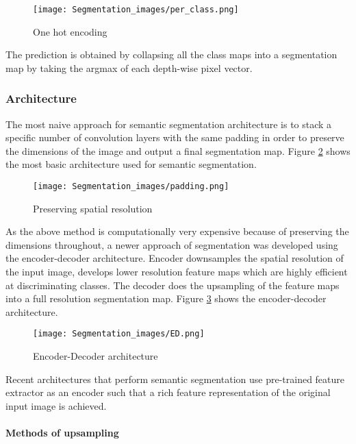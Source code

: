 \begin{figure}[h!]
    \centering
        \texttt{[image: Segmentation\_images/per\_class.png]}
    \caption{One hot encoding \cite{JJ}}
    \label{One_hot}
\end{figure}


\newpage

The prediction is obtained by collapsing all the class maps into a segmentation map by taking the argmax of each depth-wise pixel vector.

\subsubsection{Architecture}

The most naive approach for semantic segmentation architecture is to stack a specific number of convolution layers with the same padding in order to preserve the dimensions of the image and output a final segmentation map. Figure \ref{without_padding} shows the most basic architecture used for semantic segmentation.


\begin{figure}[h!]
    \centering
    \texttt{[image: Segmentation\_images/padding.png]}
    \caption{Preserving spatial resolution \cite{cs231}}
    \label{without_padding}
\end{figure}

As the above method is computationally very expensive because of preserving the dimensions throughout, a newer approach of segmentation was developed using the encoder-decoder architecture. Encoder downsamples the spatial resolution of the input image, develops lower resolution feature maps which are highly efficient at discriminating classes. The decoder does the upsampling of the feature maps into a full resolution segmentation map. Figure \ref{with_padding} shows the encoder-decoder architecture. 

\begin{figure}[h!]
    \centering
    \texttt{[image: Segmentation\_images/ED.png]}
    \caption{Encoder-Decoder architecture \cite{cs231}}
    \label{with_padding}
\end{figure}

Recent architectures that perform semantic segmentation use pre-trained feature extractor as an encoder such that a rich feature representation of the original input image is achieved.     

\paragraph{Methods of upsampling}

